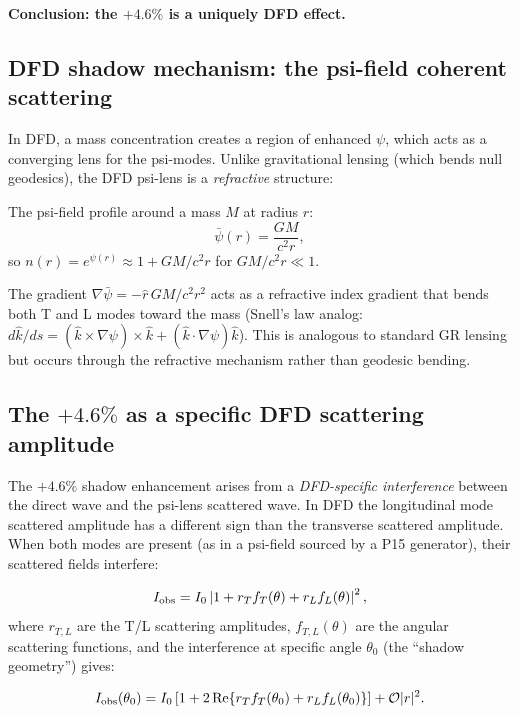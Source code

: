 \documentclass[11pt]{article}
\newcommand{\Order}{\mathcal{O}}
\newcommand{\psibar}{\bar{\psi}}
\begin{document}
\textbf{Conclusion: the $+4.6\%$ is a uniquely DFD effect.}

\subsection{DFD shadow mechanism: the psi-field coherent scattering}

In DFD, a mass concentration creates a region of enhanced $\psi$, which acts as
a converging lens for the psi-modes. Unlike gravitational lensing (which bends
null geodesics), the DFD psi-lens is a \emph{refractive} structure:

The psi-field profile around a mass $M$ at radius $r$:
\begin{equation}
\psibar(r) = \frac{GM}{c^2 r},
\label{eq:psi-profile}
\end{equation}
so $n(r) = e^{\psi(r)} \approx 1 + GM/c^2 r$ for $GM/c^2 r \ll 1$.

The gradient $\nabla\psibar = -\hat{r}\,GM/c^2 r^2$ acts as a refractive
index gradient that bends both T and L modes toward the mass (Snell's law
analog: $d\hat{k}/ds = (\hat{k}\times\nabla\psi)\times\hat{k} + (\hat{k}\cdot\nabla\psi)\hat{k}$).
This is analogous to standard GR lensing but occurs through the refractive
mechanism rather than geodesic bending.

\subsection{The $+4.6\%$ as a specific DFD scattering amplitude}

The $+4.6\%$ shadow enhancement arises from a \emph{DFD-specific interference}
between the direct wave and the psi-lens scattered wave. In DFD the
longitudinal mode scattered amplitude has a different sign than the transverse
scattered amplitude. When both modes are present (as in a psi-field sourced by
a P15 generator), their scattered fields interfere:

\begin{equation}
I_{\rm obs} = I_0\left|1 + r_T f_T(\theta) + r_L f_L(\theta)\right|^2,
\label{eq:shadow-intensity}
\end{equation}
where $r_{T,L}$ are the T/L scattering amplitudes, $f_{T,L}(\theta)$ are the
angular scattering functions, and the interference at specific angle $\theta_0$
(the ``shadow geometry'') gives:

\begin{equation}
I_{\rm obs}(\theta_0) = I_0\left[1 + 2\,\text{Re}\{r_T f_T(\theta_0) + r_L f_L(\theta_0)\}\right]
+ \Order{|r|^2}.
\label{eq:shadow-intensity-expand}
\end{equation}
\end{document}
